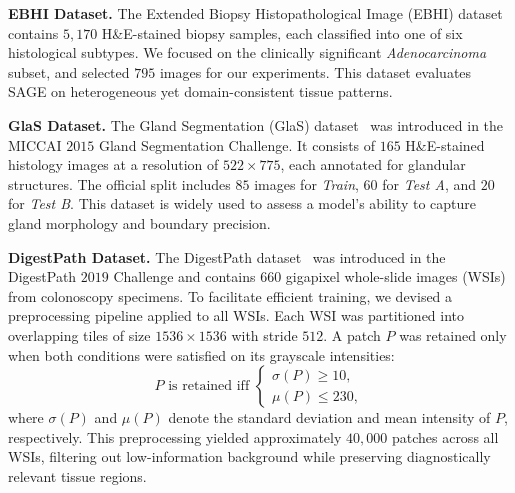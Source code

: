 
\noindent\textbf{EBHI Dataset.}
The Extended Biopsy Histopathological Image (EBHI) dataset\cite{HU2023102534} contains $5,170$ H\&E-stained biopsy samples, each classified into one of six histological subtypes. We focused on the clinically significant \textit{Adenocarcinoma} subset, and selected $795$ images for our experiments. This dataset evaluates SAGE on heterogeneous yet domain-consistent tissue patterns.


\noindent\textbf{GlaS Dataset.} 
The Gland Segmentation (GlaS) dataset~\cite{sirinukunwattana2016glandsegmentationcolonhistology} was introduced in the MICCAI $2015$ Gland Segmentation Challenge. It consists of $165$ H\&E-stained histology images at a resolution of $522 \times 775$, each annotated for glandular structures. The official split includes $85$ images for \textit{Train}, $60$ for \textit{Test A}, and $20$ for \textit{Test B}. This dataset is widely used to assess a model's ability to capture gland morphology and boundary precision.


\noindent\textbf{DigestPath Dataset.}
The DigestPath dataset~\cite{DA2022102485} was introduced in the DigestPath $2019$ Challenge and contains $660$ gigapixel whole-slide images (WSIs) from colonoscopy specimens. To facilitate efficient training, we devised a preprocessing pipeline applied to all WSIs. Each WSI was partitioned into overlapping tiles of size $1536 \times 1536$ with stride $512$. A patch $P$ was retained only when both conditions were satisfied on its grayscale intensities:
\begin{equation*}
    P \text{ is retained iff } %
\begin{cases}
\sigma(P) \ge 10, \\
\mu(P) \le 230,
\end{cases}
\end{equation*}
where $\sigma(P)$ and $\mu(P)$ denote the standard deviation and mean intensity of $P$, respectively.
This preprocessing yielded approximately $40{,}000$ patches across all WSIs, filtering out low-information background while preserving diagnostically relevant tissue regions.


